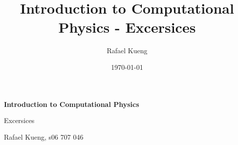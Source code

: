 \documentclass[a4paper,10pt]{article}
\title{Introduction to Computational Physics - Excersices}
\author{Rafael Kueng}
\date{\today}
\begin{document}
\LARGE
\centerline{\textbf{Introduction to Computational Physics}}
\centerline{Excersices}
\vspace{1cm}
\normalsize
\centerline{Rafael Kueng, s06 707 046}
\vspace{1cm}


\end{document}
